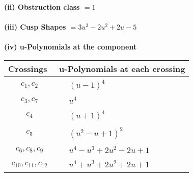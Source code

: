 \documentclass[1p]{elsarticle_modified}
\theoremstyle{definition}
\begin{document}
\flushleft \textbf{(ii) Obstruction class $= 1$}\\~\\
\flushleft \textbf{(iii) Cusp Shapes $= 3 u^3-2 u^2+2 u-5$}\\~\\
\newpage\renewcommand{\arraystretch}{1}
\flushleft \textbf{(iv) u-Polynomials at the component}\newline \\
\begin{tabular}{m{50pt}|m{274pt}}
Crossings & \hspace{64pt}u-Polynomials at each crossing \\
\hline $$\begin{aligned}c_{1},c_{2}\end{aligned}$$&$\begin{aligned}
&(u-1)^4
\end{aligned}$\\
\hline $$\begin{aligned}c_{3},c_{7}\end{aligned}$$&$\begin{aligned}
&u^4
\end{aligned}$\\
\hline $$\begin{aligned}c_{4}\end{aligned}$$&$\begin{aligned}
&(u+1)^4
\end{aligned}$\\
\hline $$\begin{aligned}c_{5}\end{aligned}$$&$\begin{aligned}
&(u^2- u+1)^2
\end{aligned}$\\
\hline $$\begin{aligned}c_{6},c_{8},c_{9}\end{aligned}$$&$\begin{aligned}
&u^4- u^3+2 u^2-2 u+1
\end{aligned}$\\
\hline $$\begin{aligned}c_{10},c_{11},c_{12}\end{aligned}$$&$\begin{aligned}
&u^4+u^3+2 u^2+2 u+1
\end{aligned}$\\
\hline
\end{tabular}\\~\\
\end{document}
